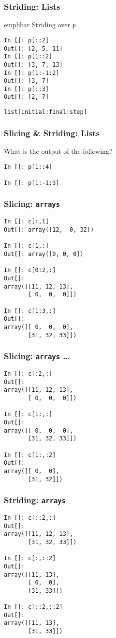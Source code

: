 \documentclass[14pt,compress]{beamer}
\newcommand{\emphbar}[1]
{\begin{beamercolorbox}[rounded=true]{emphbar} 
      {#1}
 \end{beamercolorbox}
}
\newcommand{\typ}[1]{\lstinline{#1}}
\begin{document}
\begin{frame}[fragile]
  \frametitle{Striding: Lists}
\emphbar{Striding over \typ{p}}
\begin{lstlisting}
In []: p[::2]
Out[]: [2, 5, 11]
In []: p[1::2]
Out[]: [3, 7, 13]
In []: p[1:-1:2]
Out[]: [3, 7]
In []: p[::3]
Out[]: [2, 7]
\end{lstlisting}
\alert{\typ{list[initial:final:step]}}
\end{frame}

\begin{frame}[fragile]
  \frametitle{Slicing \& Striding: Lists}
  What is the output of the following?
\begin{lstlisting}
In []: p[1::4]

In []: p[1:-1:3]
\end{lstlisting}
\end{frame}


\begin{frame}[fragile]
  \frametitle{Slicing: \typ{arrays}}
\begin{small}
  \begin{lstlisting}
In []: c[:,1]
Out[]: array([12,  0, 32])

In []: c[1,:]
Out[]: array([0, 0, 0])

In []: c[0:2,:]
Out[]: 
array([[11, 12, 13],
       [ 0,  0,  0]])

In []: c[1:3,:]
Out[]: 
array([[ 0,  0,  0],
       [31, 32, 33]])
  \end{lstlisting}
\end{small}
\end{frame}

\begin{frame}[fragile]
  \frametitle{Slicing: \typ{arrays} \ldots}
\begin{small}
  \begin{lstlisting}
In []: c[:2,:]
Out[]: 
array([[11, 12, 13],
       [ 0,  0,  0]])

In []: c[1:,:]
Out[]: 
array([[ 0,  0,  0],
       [31, 32, 33]])

In []: c[1:,:2]
Out[]: 
array([[ 0,  0],
       [31, 32]])
  \end{lstlisting}

\end{small}
\end{frame}

\begin{frame}[fragile]
  \frametitle{Striding: \typ{arrays}}
  \begin{small}
  \begin{lstlisting}
In []: c[::2,:]
Out[]: 
array([[11, 12, 13],
       [31, 32, 33]])

In []: c[:,::2]
Out[]: 
array([[11, 13],
       [ 0,  0],
       [31, 33]])

In []: c[::2,::2]
Out[]: 
array([[11, 13],
       [31, 33]])
  \end{lstlisting}
  \end{small}
\end{frame}
\end{document}
